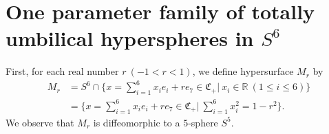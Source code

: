\documentclass[12pt]{article}
\numberwithin{equation}{section}
\begin{document}
\section{One parameter family of totally umbilical hyperspheres in $S^{6}$}\label{sec3}
First, for each real number $r~(-1<r<1)$, we define hypersurface $M_{r}$ by
\begin{equation*}
\begin{split}
M_{r}&=S^{6}\cap\{x=\sum_{i=1}^{6}x_{i}e_{i}+re_{7}\in\mathfrak{C}_{+}|~x_{i}\in\mathbb{R}~(1\leq i\leq 6)\}\\
&=\{x=\sum_{i=1}^{6}x_{i}e_{i}+re_{7}\in\mathfrak{C}_{+}|~\sum_{i=1}^6x_{i}^{2}=1-r^{2}\}.
\end{split}
\end{equation*}
We observe that $M_{r}$ is diffeomorphic to a $5$-sphere $S^{5}$.
\end{document}
